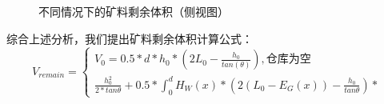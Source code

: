 \documentclass{my_paper}
\begin{document}
    \begin{figure}[htbp]
        \centering  %
        
    
        \caption{不同情况下的矿料剩余体积（侧视图）}    %
        \label{kuang_2}    %
    \end{figure}

    综合上述分析，我们提出矿料剩余体积计算公式：
        \begin{equation}
            V_{remain}=\begin{cases}V_0=0.5*d*h_0*(2L_0-\frac{h_0}{tan(\theta)}),仓库为空\\\frac{h_0^2}{2*tan\theta}+0.5*\int_0^d H_W(x)*(2(L_0-E_G(x))-\frac{h_0}{tan\theta})*
            \end{cases}
        \label{remain}
        \end{equation}
\end{document}
